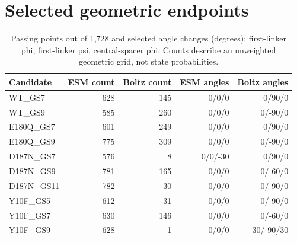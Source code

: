 \section{Selected geometric endpoints}
\begin{table}[h]
\centering
\small
\caption{Passing points out of 1,728 and selected angle changes (degrees): first-linker phi, first-linker psi, central-spacer phi. Counts describe an unweighted geometric grid, not state probabilities.}
\begin{tabular}{lrrrr}
\toprule
Candidate & ESM count & Boltz count & ESM angles & Boltz angles \\
\midrule
WT\_GS7 & 628 & 145 & 0/0/0 & 0/90/0 \\
WT\_GS9 & 585 & 260 & 0/0/0 & 0/-90/0 \\
E180Q\_GS7 & 601 & 249 & 0/0/0 & 0/90/0 \\
E180Q\_GS9 & 775 & 309 & 0/0/0 & 0/-90/0 \\
D187N\_GS7 & 576 & 8 & 0/0/-30 & 0/90/0 \\
D187N\_GS9 & 781 & 165 & 0/0/0 & 0/-60/0 \\
D187N\_GS11 & 782 & 30 & 0/0/0 & 0/-90/0 \\
Y10F\_GS5 & 612 & 31 & 0/0/0 & 0/-90/0 \\
Y10F\_GS7 & 630 & 146 & 0/0/0 & 0/-60/0 \\
Y10F\_GS9 & 628 & 1 & 0/0/0 & 30/-90/30 \\
\bottomrule
\end{tabular}
\end{table}
